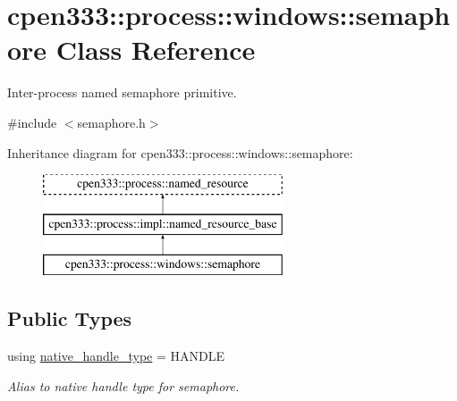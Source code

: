\hypertarget{classcpen333_1_1process_1_1windows_1_1semaphore}{}\section{cpen333\+:\+:process\+:\+:windows\+:\+:semaphore Class Reference}
\label{classcpen333_1_1process_1_1windows_1_1semaphore}


Inter-\/process named semaphore primitive.  




{\ttfamily \#include $<$semaphore.\+h$>$}

Inheritance diagram for cpen333\+:\+:process\+:\+:windows\+:\+:semaphore\+:\begin{figure}[H]
\begin{center}
\leavevmode
\includegraphics[height=3.000000cm]{classcpen333_1_1process_1_1windows_1_1semaphore}
\end{center}
\end{figure}
\subsection*{Public Types}
\begin{DoxyCompactItemize}
\item 
using \hyperlink{classcpen333_1_1process_1_1windows_1_1semaphore_aa3e5433587a4f60fc2984eb3509946c9}{native\+\_\+handle\+\_\+type} = H\+A\+N\+D\+LE
\begin{DoxyCompactList}\small\item\em Alias to native handle type for semaphore. \end{DoxyCompactList}\end{DoxyCompactItemize}
